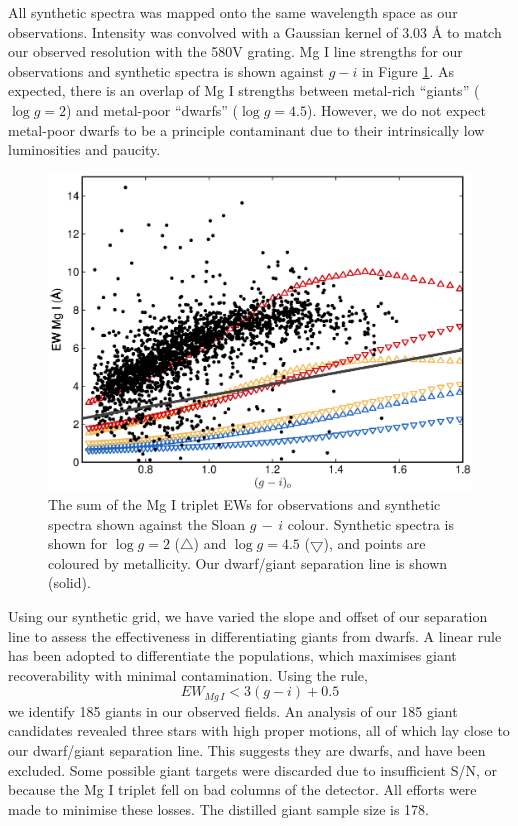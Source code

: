 \documentclass[preprint2]{aastex}
\begin{document}
All synthetic spectra was mapped onto the same wavelength space as our observations. Intensity was convolved with a Gaussian kernel of 3.03 \AA{} to match our observed resolution with the 580V grating. Mg I line strengths for our observations and synthetic spectra is shown against $g - i$ in Figure \ref{fig:dwarf-giant-separation}. As expected, there is an overlap of Mg I strengths between metal-rich ``giants'' ($\log{g} = 2$) and metal-poor ``dwarfs'' ($\log{g} = 4.5$). However, we do not expect metal-poor dwarfs to be a principle contaminant due to their intrinsically low luminosities and paucity.
\begin{figure}[h]
	\includegraphics[width=\columnwidth]{./figures/dwarfgiants.eps}
	\caption{The sum of the Mg I triplet EWs for observations and synthetic spectra shown against the Sloan $g\,-\,i$ colour. Synthetic spectra is shown for $\log{g} = 2$ ($\bigtriangleup$) and $\log{g} = 4.5$ ($\bigtriangledown$), and points are coloured by metallicity. Our dwarf/giant separation line is shown (solid). }
	\label{fig:dwarf-giant-separation}
\end{figure}
 Using our synthetic grid, we have varied the slope and offset of our separation line to assess the effectiveness in differentiating giants from dwarfs.  A linear rule has been adopted to differentiate the populations, which maximises giant recoverability with minimal contamination. Using the rule,
\begin{equation}
	EW_{Mg\,I} < 3(g-i) + 0.5
\end{equation}
\noindent we identify 185 giants in our observed fields. An analysis of our 185 giant candidates revealed three stars with high proper motions, all of which lay close to our dwarf/giant separation line. This suggests they are dwarfs, and have been excluded. Some possible giant targets were discarded due to insufficient S/N, or because the Mg I triplet fell on bad columns of the detector. All efforts were made to minimise these losses. The distilled giant sample size is 178.
\end{document}
